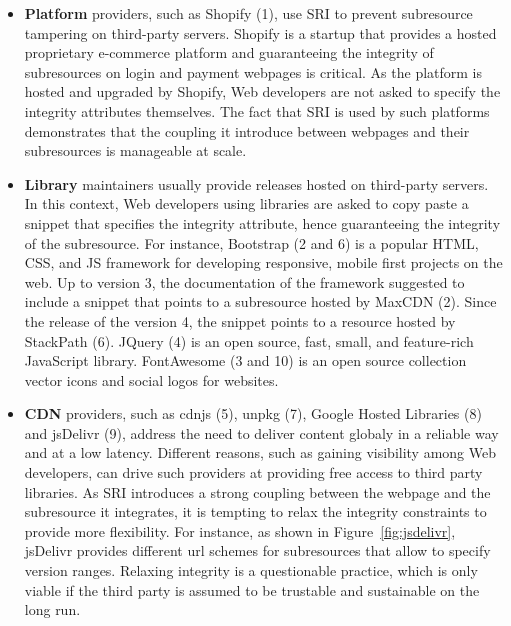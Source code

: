 \documentclass[sigconf,table]{acmart}
\begin{document}
\begin{itemize}
	\item
		\textbf{Platform} providers, such as Shopify (1), use SRI to prevent subresource tampering on third-party servers. 
		Shopify is a startup that provides a hosted proprietary e-commerce platform and guaranteeing the integrity of subresources on login and payment webpages is critical.
		As the platform is hosted and upgraded by Shopify, Web developers are not asked to specify the integrity attributes themselves.
		The fact that SRI is used by such platforms demonstrates that the coupling it introduce between webpages and their subresources is  manageable at scale.
	\item
		\textbf{Library} maintainers usually provide releases hosted on third-party servers.
		In this context, Web developers using libraries are asked to copy paste a snippet that specifies the integrity attribute, hence guaranteeing the integrity of the subresource.
		For instance, Bootstrap (2 and 6) is a popular HTML, CSS, and JS framework for developing responsive, mobile first projects on the web. 
		Up to version 3, the documentation of the framework suggested to include a snippet that points to a subresource hosted by MaxCDN (2).
		Since the release of the version 4, the snippet points to a resource hosted by StackPath (6).
		JQuery (4) is an open source, fast, small, and feature-rich JavaScript library.
		FontAwesome (3 and 10) is an open source collection vector icons and social logos for websites.
	\item
		\textbf{CDN} providers, such as cdnjs (5), unpkg (7), Google Hosted Libraries (8) and jsDelivr (9), address the need to deliver content globaly in a reliable way and at a low latency.
		Different reasons, such as gaining visibility among Web developers, can drive such providers at providing free access to third party libraries.
		As SRI introduces a strong coupling between the webpage and the subresource it integrates, it is tempting to relax the integrity constraints to provide more flexibility.
		For instance, as shown in Figure~\ref{fig:jsdelivr}, jsDelivr provides different url schemes for subresources that allow to specify version ranges.
		Relaxing integrity is a questionable practice, which is only viable if the third party is assumed to be trustable and sustainable on the long run. 
\end{itemize}
\end{document}
